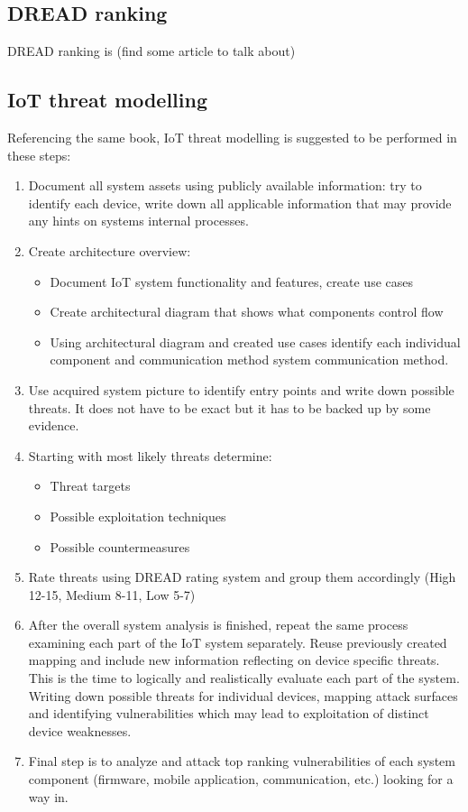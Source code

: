 \subsection{DREAD ranking}
DREAD ranking is (find some article to talk about)

\subsection{IoT threat modelling}
Referencing the same book, IoT threat modelling is suggested to be performed in these steps:
\begin{enumerate}
	\item Document all system assets using publicly available information: try to identify each device, write down all applicable information that may provide any hints on systems internal processes.
	\item Create architecture overview:
	\begin{itemize}
		\item Document IoT system functionality and features, create use cases
		\item Create architectural diagram that shows what components control flow
		\item Using architectural diagram and created use cases identify each individual component and communication method system communication method.
	\end{itemize}
	\item Use acquired system picture to identify entry points and write down possible threats. It does not have to be exact but it has to be backed up by some evidence.
	\item Starting with most likely threats determine:
	\begin{itemize}
		\item Threat targets 
		\item Possible exploitation techniques
		\item Possible countermeasures
	\end{itemize}
	\item Rate threats using DREAD rating system\cite{dread} and group them accordingly (High 12-15, Medium 8-11, Low 5-7)
	\item After the overall system analysis is finished, repeat the same process examining each part of the IoT system separately. Reuse previously created mapping and include new information reflecting on device specific threats. This is the time to logically and realistically evaluate each part of the system.
	Writing down possible threats for individual devices, mapping attack surfaces and identifying vulnerabilities which may lead to exploitation of distinct device weaknesses.
	\item Final step is to analyze and attack top ranking vulnerabilities of each system component (firmware, mobile application, communication, etc.) looking for a way in.
\end{enumerate}